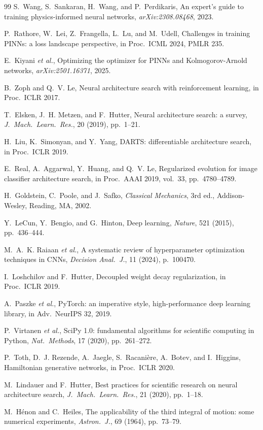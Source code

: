 \documentclass[11pt]{article}
\begin{document}
\begin{thebibliography}{99}
S.~Wang, S.~Sankaran, H.~Wang, and P.~Perdikaris,
An expert's guide to training physics-informed neural networks,
\textit{arXiv:2308.08468}, 2023.

P.~Rathore, W.~Lei, Z.~Frangella, L.~Lu, and M.~Udell,
Challenges in training PINNs: a loss landscape perspective,
in Proc.\ ICML 2024, PMLR 235.

E.~Kiyani \textit{et al.},
Optimizing the optimizer for PINNs and Kolmogorov-Arnold networks,
\textit{arXiv:2501.16371}, 2025.

B.~Zoph and Q.~V. Le,
Neural architecture search with reinforcement learning,
in Proc.\ ICLR 2017.

T.~Elsken, J.~H. Metzen, and F.~Hutter,
Neural architecture search: a survey,
\textit{J.\ Mach.\ Learn.\ Res.}, 20 (2019), pp.~1--21.

H.~Liu, K.~Simonyan, and Y.~Yang,
DARTS: differentiable architecture search,
in Proc.\ ICLR 2019.

E.~Real, A.~Aggarwal, Y.~Huang, and Q.~V. Le,
Regularized evolution for image classifier architecture search,
in Proc.\ AAAI 2019, vol.~33, pp.~4780--4789.

H.~Goldstein, C.~Poole, and J.~Safko,
\textit{Classical Mechanics}, 3rd ed.,
Addison-Wesley, Reading, MA, 2002.

Y.~LeCun, Y.~Bengio, and G.~Hinton,
Deep learning,
\textit{Nature}, 521 (2015), pp.~436--444.

M.~A.~K. Raiaan \textit{et al.},
A systematic review of hyperparameter optimization techniques in CNNs,
\textit{Decision Anal.\ J.}, 11 (2024), p.~100470.

I.~Loshchilov and F.~Hutter,
Decoupled weight decay regularization,
in Proc.\ ICLR 2019.

A.~Paszke \textit{et al.},
PyTorch: an imperative style, high-performance deep learning library,
in Adv.\ NeurIPS 32, 2019.

P.~Virtanen \textit{et al.},
SciPy 1.0: fundamental algorithms for scientific computing in Python,
\textit{Nat.\ Methods}, 17 (2020), pp.~261--272.

P.~Toth, D.~J. Rezende, A.~Jaegle, S.~Racani\`{e}re, A.~Botev,
and I.~Higgins,
Hamiltonian generative networks,
in Proc.\ ICLR 2020.

M.~Lindauer and F.~Hutter,
Best practices for scientific research on neural architecture search,
\textit{J.\ Mach.\ Learn.\ Res.}, 21 (2020), pp.~1--18.

M.~H\'{e}non and C.~Heiles,
The applicability of the third integral of motion: some numerical
experiments,
\textit{Astron.\ J.}, 69 (1964), pp.~73--79.

\end{thebibliography}
\end{document}
